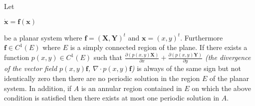 \documentclass[12pt]{article}
\begin{document}
Let
\begin{center}
$\dot{\textbf{x}} = \textbf{f}(\textbf{x})$
\end{center}
be a planar system where $\textbf{f} = (\textbf{X},\textbf{Y})^t$ and $\textbf{x} = (x,y)^t$. Furthermore $\textbf{f} \in C^1(E)$ where $E$ is a simply connected region of the plane. If there exists a function $p(x,y)\in C^1(E)$ such that $\frac{\partial (p(x,y)\textbf{X})}{\partial x}+\frac{\partial (p(x,y)\textbf{Y})}{\partial y}$ \textit{(the divergence of the vector field $p(x,y)\textbf{f}$, $\nabla \cdot p(x,y)\textbf{f}$)} is always of the same sign but not identically zero then there are no periodic solution in the region $E$ of the planar system.  In addition, if $A$ is an annular region contained in $E$ on which the above condition is satisfied then there exists at most one periodic solution in $A$.
\end{document}
